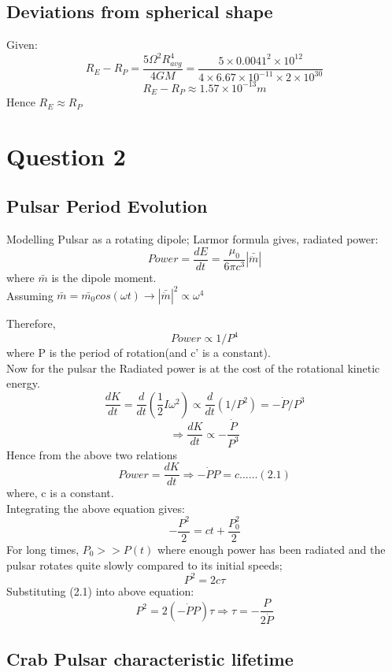\documentclass[11pt]{article}
\begin{document}
	\subsection{Deviations from spherical shape}
	
	Given:
	\[
		R_E - R_P = \frac{5\Omega^2 R_{avg}^4}{4GM} = \frac{5\times 0.0041^2 \times 10^{12} }{4\times 6.67 \times 10^{-11} \times 2 \times 10^{30}} 
	\]
	\[
		R_E - R_P \approx 1.57 \times 10^{-13} m
	\]	
	Hence \(\boxed{R_E \approx R_P}\)

	
	\section{\color{teal} Question 2}
	
	\subsection{Pulsar Period Evolution}
	
	Modelling Pulsar as a rotating dipole; Larmor formula gives, radiated power:
	\[
		Power = \frac{dE}{dt} = \frac{\mu_0}{6\pi c^3}|\bar{\ddot{m}}|
	\]
	where $\bar{m}$ is the dipole moment.\\
	Assuming $\bar{m} = \bar{m_0}cos(\omega t) \rightarrow |\bar{\ddot{m}}|^2 \propto \omega^4$
	
	Therefore, \[ Power \propto 1/P^4 \]
	where P is the period of rotation(and c' is a constant).\\
	
	Now for the pulsar the Radiated power is at the cost of the rotational kinetic energy.
	\[
		\frac{dK}{dt} = \frac{d}{dt}( \frac{1}{2}I \omega^2) \propto \frac{d}{dt} (1/P^2) = - \dot{P}/P^3 
	\]
	\[
		\Rightarrow \frac{dK}{dt} \propto - \frac{\dot{P}}{P^3}
	\]
	Hence from the above two relations
	\[
		Power = \frac{dK}{dt} \Rightarrow -\dot{P}P = c......(2.1)
	\]
	where, c is a constant.\\
	
	Integrating the above equation gives:
	\[
		-\frac{P^2}{2} = ct + \frac{P_0^2}{2}
	\] 
	For long times, \(P_0 >> P(t)\) where enough power has been radiated and the pulsar rotates quite slowly compared to its initial speeds;
	\[
		P^2 = 2c \tau
	\]
	Substituting (2.1) into above equation:
	\[
		P^2 = 2(-\dot{P}P)\tau \Rightarrow \boxed{\tau = - \frac{P}{2\dot{P}}} 
	\]
	
	\subsection{Crab Pulsar characteristic lifetime}
	
\end{document}

